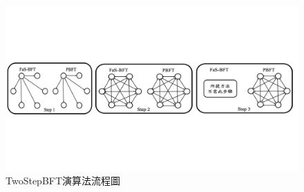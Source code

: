 \begin{figure}
\centering
\includegraphics[scale=0.45]{images/31.png}
\caption{TwoStepBFT演算法流程圖}
\label{i:byz-latency}
\end{figure}